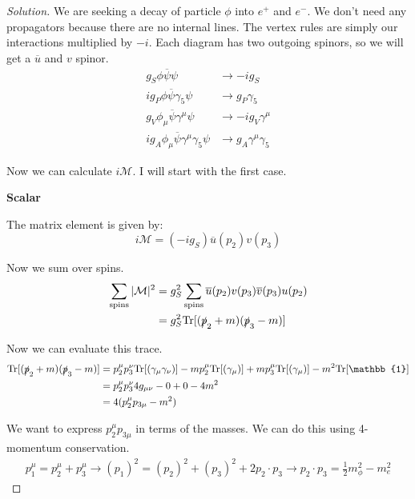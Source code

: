 \documentclass[12pt]{article}
\newenvironment{solution}{\begin{proof}[Solution]}{\end{proof}}
\begin{document}
\begin{solution}
We are seeking a decay of particle $\phi$ into $e^+$ and $e^-$. We don't need any propagators because there are no internal lines. The vertex rules are simply our interactions multiplied by $-i$. Each diagram has two outgoing spinors, so we will get a $\overline{u}$ and $v$ spinor.
\begin{align*}
    g_S\phi\overline{\psi}\psi &\rightarrow -i g_S \\
    ig_P\phi\overline{\psi}\gamma_5\psi &\rightarrow g_P \gamma_5 \\
    g_V \phi_\mu \overline{\psi}\gamma^\mu\psi &\rightarrow -ig_V\gamma^\mu \\
    ig_A\phi_\mu\overline{\psi}\gamma^\mu\gamma_5\psi &\rightarrow g_A \gamma^\mu \gamma_5
\end{align*}

Now we can calculate $i\mathcal{M}$. I will start with the first case.
\newline

\textbf{Scalar}

The matrix element is given by:
\begin{equation*}
    i\mathcal{M}=(-ig_S)\overline{u}(p_2)v(p_3)
\end{equation*}

Now we sum over spins.
\begin{align*}
    \sum_{\text{spins}} |\mathcal{M}|^2&=g_S^2\sum_{\text{spins}}\overline{u}(p_2)v(p_3)\overline{v}(p_3)u(p_2) \\
    &= g_S^2\text{Tr}[(\slashed{p}_2+m)(\slashed{p}_3-m)]
\end{align*}

Now we can evaluate this trace.
\begin{align*}
    \text{Tr}[(\slashed{p}_2+m)(\slashed{p}_3-m)]&=p_2^\mu p_3^\nu\text{Tr}[ (\gamma_\mu \gamma_\nu)]-m p_2^\mu\text{Tr}[ (\gamma_\mu)]+m p_3^\mu\text{Tr}[ (\gamma_\mu)]-m^2\text{Tr}[\mathbb{1}] \\
    &= p_2^\mu p_3^\nu 4g_{\mu\nu} - 0 + 0 - 4m^2 \\
    &= 4(p_2^\mu p_{3\mu}-m^2)
\end{align*}

We want to express $p_2^\mu p_{3\mu}$ in terms of the masses. We can do this using 4-momentum conservation.
\begin{align*}
    p_1^\mu=p_2^\mu+p_3^\mu \rightarrow (p_1)^2=(p_2)^2+(p_3)^2+2p_2\cdot p_3 \rightarrow p_2 \cdot p_3 =\frac{1}{2}m_\phi^2-m_e^2
\end{align*}


\end{solution}
\end{document}
